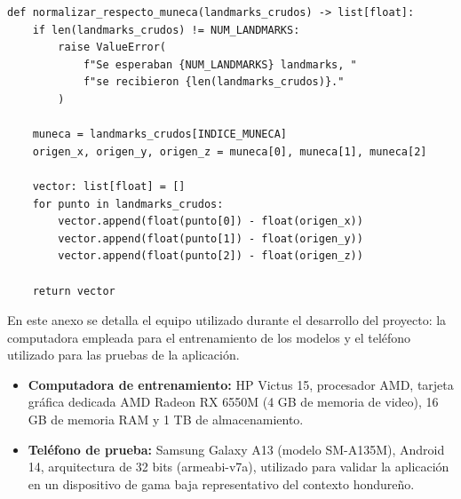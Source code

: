 \begin{listing}[H]
    \caption[Fragmento de código en Python para la normalización de landmarks respecto a la muñeca]{Fragmento de código en Python para la normalización de landmarks respecto a la muñeca (\texttt{training/comun/normalizacion.py})}
    \label{cod:anexo-normalizacion}
    \begin{verbatim}
def normalizar_respecto_muneca(landmarks_crudos) -> list[float]:
    if len(landmarks_crudos) != NUM_LANDMARKS:
        raise ValueError(
            f"Se esperaban {NUM_LANDMARKS} landmarks, "
            f"se recibieron {len(landmarks_crudos)}."
        )

    muneca = landmarks_crudos[INDICE_MUNECA]
    origen_x, origen_y, origen_z = muneca[0], muneca[1], muneca[2]

    vector: list[float] = []
    for punto in landmarks_crudos:
        vector.append(float(punto[0]) - float(origen_x))
        vector.append(float(punto[1]) - float(origen_y))
        vector.append(float(punto[2]) - float(origen_z))

    return vector
    \end{verbatim}
\end{listing}

\clearpage

\begin{tcolorbox}[colback=gray!5!white, colframe=gray!60!black, title=Anexo C \- Equipo utilizado]
	En este anexo se detalla el equipo utilizado durante el desarrollo del proyecto: la
	computadora empleada para el entrenamiento de los modelos y el teléfono utilizado para las
	pruebas de la aplicación.
\end{tcolorbox}

\begin{itemize}
	\item \textbf{Computadora de entrenamiento:} HP Victus 15, procesador AMD, tarjeta gráfica
	dedicada AMD Radeon RX 6550M (4 GB de memoria de video), 16 GB de memoria RAM y 1 TB de
	almacenamiento.
	\item \textbf{Teléfono de prueba:} Samsung Galaxy A13 (modelo SM-A135M), Android 14,
	arquitectura de 32 bits (armeabi-v7a), utilizado para validar la aplicación en un
	dispositivo de gama baja representativo del contexto hondureño.
\end{itemize}
